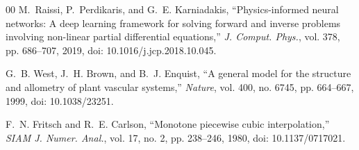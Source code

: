 \documentclass[conference]{IEEEtran}
\begin{document}
\begin{thebibliography}{00}
M.~Raissi, P.~Perdikaris, and G.~E. Karniadakis, ``Physics-informed neural networks: A deep learning framework for solving forward and inverse problems involving non-linear partial differential equations,'' \textit{J. Comput. Phys.}, vol. 378, pp. 686--707, 2019, doi: 10.1016/j.jcp.2018.10.045.

G.~B. West, J.~H. Brown, and B.~J. Enquist, ``A general model for the structure and allometry of plant vascular systems,'' \textit{Nature}, vol. 400, no. 6745, pp. 664--667, 1999, doi: 10.1038/23251.

F.~N. Fritsch and R.~E. Carlson, ``Monotone piecewise cubic interpolation,'' \textit{SIAM J. Numer. Anal.}, vol. 17, no. 2, pp. 238--246, 1980, doi: 10.1137/0717021.

\end{thebibliography}
\end{document}
